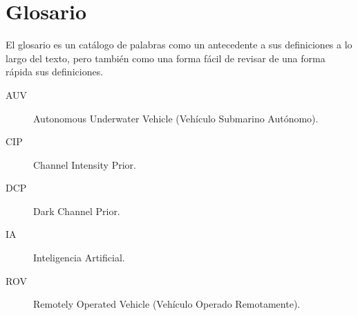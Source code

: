 \documentclass[12pt,letterpaper,spanish,twoside,openright]{report}
\begin{document}
\cleardoublepage

\tableofcontents
\cleardoublepage

\listoffigures
\cleardoublepage

\listoftables
\cleardoublepage

\lstlistoflistings
\cleardoublepage


\chapter*{Glosario}
El glosario es un catálogo de palabras como un antecedente a sus definiciones a lo largo del texto, pero también como una forma fácil de revisar de una forma rápida sus definiciones.
\begin{description}
    \item[AUV] Autonomous Underwater Vehicle (Vehículo Submarino Autónomo).
    \item[CIP] Channel Intensity Prior.
    \item[DCP] Dark Channel Prior.
    \item[IA] Inteligencia Artificial.
    \item[ROV] Remotely Operated Vehicle (Vehículo Operado Remotamente).
\end{description}

\cleardoublepage
{} %


\end{document}

